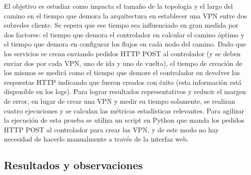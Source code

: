 El objetivo es estudiar como impacta el tamaño de la topología y el largo del camino en el tiempo que demora la arquitectura en establecer una VPN entre dos subredes cliente. Se espera que ese tiempo sea influenciado en gran medida por dos factores: el tiempo que demora el controlador en calcular el camino óptimo y el tiempo que demora en configurar los flujos en cada nodo del camino. Dado que los servicios se crean enviando pedidos HTTP POST al controlador (y se deben enviar dos por cada VPN, uno de ida y uno de vuelta), el tiempo de creación de los mismos se medirá como el tiempo que demore el controlador en devolver las respuestas HTTP indicando que fueron creados con éxito (esta información está disponible en los logs). Para lograr resultados representativos y reducir el margen de error, en lugar de crear una VPN y medir su tiempo solamente, se realizan cuatro ejecuciones y se calculan las métricas estadísticas relevantes. Para agilizar la ejecución de esta prueba se utiliza un script en Python que manda los pedidos HTTP POST al controlador para crear las VPN, y de este modo no hay necesidad de hacerlo manualmente a través de la interfaz web.

\subsection{Resultados y observaciones}

